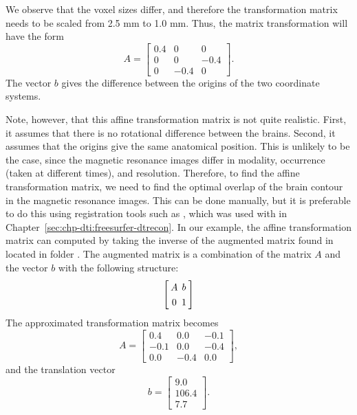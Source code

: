 
We observe that the voxel sizes differ, and therefore the transformation matrix 
needs to be scaled from 2.5 mm to 1.0 mm. Thus, the matrix transformation will 
have the form 
\[
A = \left[
\begin{array}{ccc}
0.4 & 0 & 0 \\
0 & 0 & -0.4 \\
0 & -0.4 & 0
\end{array}\right].
\]
The vector $b$ gives the difference between the origins of the two
coordinate systems.

Note, however, that this affine transformation matrix is not quite
realistic. First, it assumes that there is no rotational difference
between the brains. Second, it assumes that the origins give the same anatomical
position. This is unlikely to be the case, since the magnetic resonance images 
differ in modality, occurrence (taken at different times), and
resolution. Therefore, to find the affine transformation
matrix, we need to find the optimal overlap of the brain contour in
the magnetic resonance images. This can be done manually, but it is preferable 
to do this using registration tools such as , which was used with
 in Chapter~\ref{sec:chp-dti:freesurfer-dtrecon}. In
our example, the affine transformation matrix can computed by taking
the inverse of the augmented matrix found in 
located in folder . The augmented
matrix is a combination of the matrix $A$ and the vector $b$ with the
following structure:
\[\arraycolsep=2.0pt\def\arraystretch{1.3}
\left[
\begin{array}{cc}
  A  & b \\
  0 & 1\\
\end{array}\right]
\] 
The approximated
transformation matrix becomes
\[
A = \left[
\begin{array}{ccc}
  0.4 & 0.0 &-0.1 \\
 -0.1 & 0.0 &-0.4 \\
  0.0 &-0.4 & 0.0 
\end{array}\right],
\]
and the translation vector 
\[
b = \left[
\begin{array}{c}
  9.0 \\
106.4 \\
  7.7
\end{array}\right].
\]










